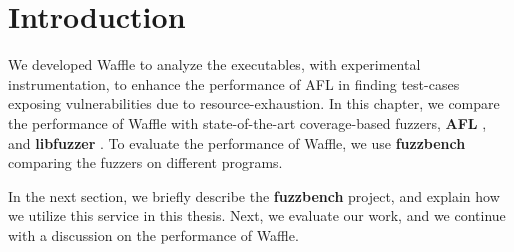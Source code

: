 \section{Introduction}

We developed Waffle to analyze the executables, with experimental instrumentation, to enhance the performance of AFL in finding test-cases exposing vulnerabilities due to resource-exhaustion. In this chapter, we compare the performance of Waffle with state-of-the-art coverage-based fuzzers, \textbf{AFL} \cite{afl_git}, and \textbf{libfuzzer} \cite{serebryany2015libfuzzer}. To evaluate the performance of Waffle, we use \textbf{fuzzbench} \cite{metzman2020fuzzbench} comparing the fuzzers on different programs.

In the next section, we briefly describe the \textbf{fuzzbench} project, and explain how we utilize this service in this thesis. Next, we evaluate our work, and we continue with a discussion on the performance of Waffle.
